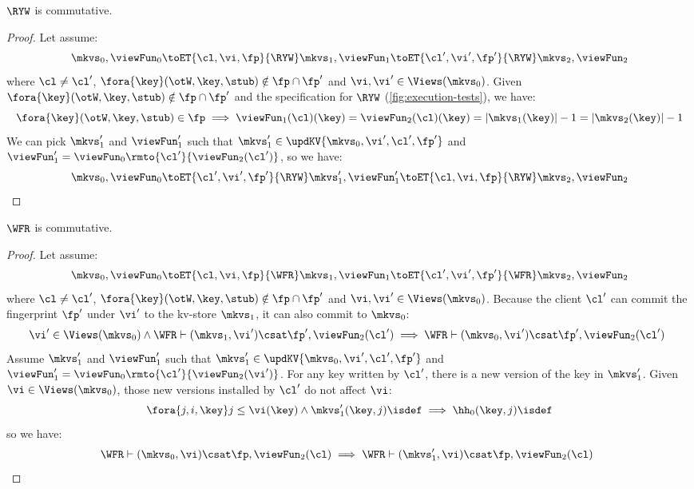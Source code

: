 \begin{lemma}
    \label{lem:ryw-comm}
    \(\RYW\) is commutative.
\end{lemma}
\begin{proof}
    Let assume:
    \[
        \mkvs_0, \viewFun_0 \toET{\cl, \vi, \fp}{\RYW} \mkvs_1, \viewFun_1 \toET{\cl', \vi', \fp'}{\RYW} \mkvs_2, \viewFun_2 
    \]
    where \( \cl \neq \cl' \), \( \fora{ \key } (\otW, \key, \stub) \notin \fp \cap \fp' \) and \( \vi, \vi' \in \Views(\mkvs_0)\).
    Given \( \fora{ \key } (\otW, \key, \stub) \notin \fp \cap \fp' \) and the specification for \( \RYW \) (\cref{fig:execution-tests}), we have:
    \[
        \fora{\key} (\otW, \key, \stub) \in \fp \implies \viewFun_1(\cl)(\key) = \viewFun_2(\cl)(\key) = \lvert \mkvs_1(\key) \rvert - 1 = \lvert \mkvs_2(\key) \rvert - 1
    \]
    We can pick \( \mkvs'_1 \) and \( \viewFun'_1 \) such that \( \mkvs'_1 \in \updKV{\mkvs_0,\vi',\cl',\fp'} \) and \( \viewFun'_1 = \viewFun_0\rmto{\cl'}{\viewFun_2(\cl')} \), so we have:
    \[
        \mkvs_0, \viewFun_0 \toET{\cl', \vi', \fp'}{\RYW} \mkvs'_1, \viewFun'_1 \toET{\cl, \vi, \fp}{\RYW} \mkvs_2, \viewFun_2 
    \]
\end{proof}

\begin{lemma}
    \label{lem:wfr-comm}
    \(\WFR\) is commutative.
\end{lemma}
\begin{proof}
    Let assume:
    \[
        \mkvs_0, \viewFun_0 \toET{\cl, \vi, \fp}{\WFR} \mkvs_1, \viewFun_1 \toET{\cl', \vi', \fp'}{\WFR} \mkvs_2, \viewFun_2 
    \]
    where \( \cl \neq \cl' \), \( \fora{ \key } (\otW, \key, \stub) \notin \fp \cap \fp' \) and \( \vi, \vi' \in \Views(\mkvs_0)\).
    Because the client \( \cl' \) can commit the fingerprint \( \fp' \) under \( \vi' \) to the kv-store \( \mkvs_1 \), it can also commit to \( \mkvs_0 \):
    \[
        \begin{array}{@{}l}
            \vi' \in \Views(\mkvs_0) \land \WFR \vdash (\mkvs_1, \vi') \csat \fp', \viewFun_2(\cl') \implies  \WFR \vdash (\mkvs_0, \vi') \csat \fp', \viewFun_2(\cl')
        \end{array}
    \]
    Assume \( \mkvs'_1 \) and \( \viewFun'_1 \) such that \( \mkvs'_1 \in \updKV{\mkvs_0,\vi',\cl',\fp'} \) and \( \viewFun'_1 = \viewFun_0\rmto{\cl'}{\viewFun_2(\vi')} \).
    For any key written by \( \cl' \), there is a new version of the key in \( \mkvs'_1 \).
    Given \( \vi \in \Views(\mkvs_0)\), those new versions installed by \( \cl' \) do not affect \( \vi \):
    \[
        \fora{j,i, \key} j \leq \vi(\key) \land \mkvs'_1(\key, j)\isdef \implies \hh_0(\key, j)\isdef
    \]
    so we have:
    \[
        \begin{array}{@{}l}
            \WFR \vdash (\mkvs_0, \vi) \csat \fp, \viewFun_2(\cl) \implies \WFR \vdash (\mkvs'_1, \vi) \csat \fp, \viewFun_2(\cl)
        \end{array}
    \]
\end{proof}

